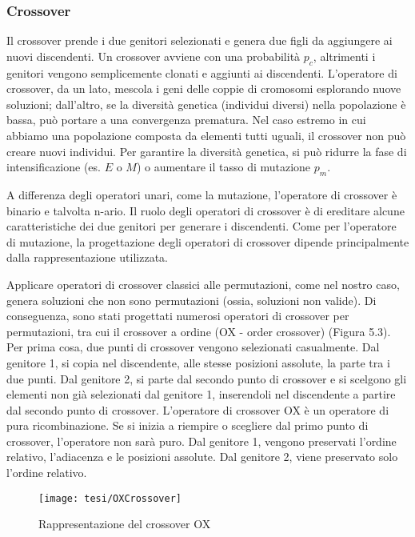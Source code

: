 \subsubsection{Crossover}
Il crossover prende i due genitori selezionati e genera due figli da aggiungere ai nuovi discendenti. Un crossover avviene con una probabilità $p_c$, altrimenti i genitori vengono semplicemente clonati e aggiunti ai discendenti. L'operatore di crossover, da un lato, mescola i geni delle coppie di cromosomi esplorando nuove soluzioni; dall'altro, se la diversità genetica (individui diversi) nella popolazione è bassa, può portare a una convergenza prematura. Nel caso estremo in cui abbiamo una popolazione composta da elementi tutti uguali, il crossover non può creare nuovi individui. Per garantire la diversità genetica, si può ridurre la fase di intensificazione (es. $E$ o $M$) o aumentare il tasso di mutazione $p_m$.

A differenza degli operatori unari, come la mutazione, l'operatore di crossover è binario e talvolta n-ario. Il ruolo degli operatori di crossover è di ereditare alcune caratteristiche dei due genitori per generare i discendenti. Come per l'operatore di mutazione, la progettazione degli operatori di crossover dipende principalmente dalla rappresentazione utilizzata.

Applicare operatori di crossover classici alle permutazioni, come nel nostro caso, genera soluzioni che non sono permutazioni (ossia, soluzioni non valide). Di conseguenza, sono stati progettati numerosi operatori di crossover per permutazioni, tra cui il crossover a ordine (OX - order crossover) (Figura 5.3). Per prima cosa, due punti di crossover vengono selezionati casualmente. Dal genitore 1, si copia nel discendente, alle stesse posizioni assolute, la parte tra i due punti. Dal genitore 2, si parte dal secondo punto di crossover e si scelgono gli elementi non già selezionati dal genitore 1, inserendoli nel discendente a partire dal secondo punto di crossover. L'operatore di crossover OX è un operatore di pura ricombinazione. Se si inizia a riempire o scegliere dal primo punto di crossover, l'operatore non sarà puro. Dal genitore 1, vengono preservati l'ordine relativo, l'adiacenza e le posizioni assolute. Dal genitore 2, viene preservato solo l'ordine relativo. 

\begin{figure}[!ht] 
    \centering 
    \texttt{[image: tesi/OXCrossover]} 
    \caption{Rappresentazione del crossover OX}
\end{figure}

